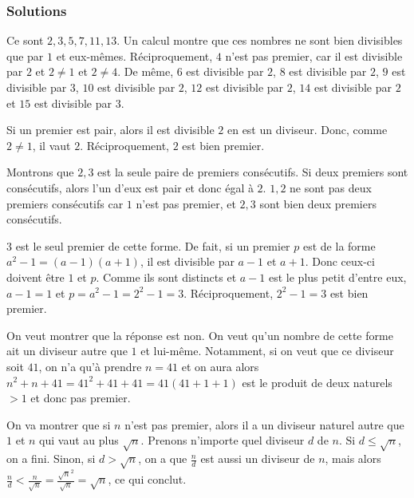 \subsubsection{Solutions}


\begin{sol}
Ce sont $2, 3, 5, 7, 11, 13$. Un calcul montre que ces nombres ne sont bien divisibles que par $1$ et eux-mêmes. Réciproquement, $4$ n'est pas premier, car il est divisible par $2$ et $2\ne 1$ et $2\ne 4$. De même, $6$ est divisible par $2$, $8$ est divisible par $2$, $9$ est divisible par $3$, $10$ est divisible par $2$, $12$ est divisible par $2$, $14$ est divisible par $2$ et $15$ est divisible par $3$.
\end{sol}


\begin{sol}
Si un premier est pair, alors il est divisible $2$ en est un diviseur. Donc, comme $2\ne 1$, il vaut $2$. Réciproquement, $2$ est bien premier.
\end{sol}


\begin{sol}
Montrons que $2, 3$ est la seule paire de premiers consécutifs. Si deux premiers sont consécutifs, alors l'un d'eux est pair et donc égal à $2$. $1, 2$ ne sont pas deux premiers consécutifs car $1$ n'est pas premier, et $2, 3$ sont bien deux premiers consécutifs.
\end{sol}


\begin{sol}
$3$ est le seul premier de cette forme. De fait, si un premier $p$ est de la forme $a^2 - 1 = (a - 1)(a + 1)$, il est divisible par $a - 1$ et $a + 1$. Donc ceux-ci doivent être $1$ et $p$. Comme ils sont distincts et $a - 1$ est le plus petit d'entre eux, $a - 1 = 1$ et $p = a^2 - 1 = 2^2 - 1 = 3$. Réciproquement, $2^2 - 1 = 3$ est bien premier.
\end{sol}


\begin{sol}
On veut montrer que la réponse est non. On veut qu'un nombre de cette forme ait un diviseur autre que $1$ et lui-même. Notamment, si on veut que ce diviseur soit $41$, on n'a qu'à prendre $n=41$ et on aura alors $n^2 + n + 41 = 41^2 + 41 + 41 = 41 \left(41 + 1 + 1\right)$ est le produit de deux naturels $>1$ et donc pas premier.
\end{sol}


\begin{sol}
On va montrer que si $n$ n'est pas premier, alors il a un diviseur naturel autre que $1$ et $n$ qui vaut au plus $\sqrt n$. Prenons n'importe quel diviseur $d$ de $n$. Si $d \le \sqrt n$, on a fini. Sinon, si $d > \sqrt n$, on a que $\frac nd$ est aussi un diviseur de $n$, mais alors $\frac nd < \frac n{{\sqrt n}} = \frac{{\sqrt n}^2 }{\sqrt n} = \sqrt n$, ce qui conclut.
\end{sol}



